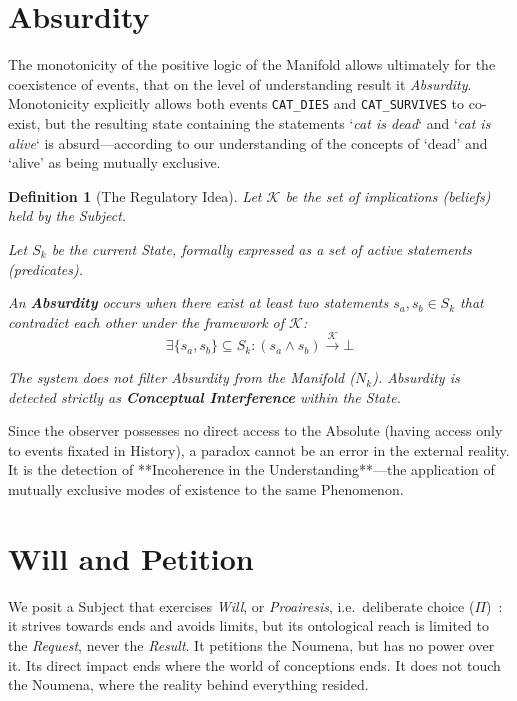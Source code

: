 \documentclass[11pt, a4paper]{article}
\theoremstyle{formalism}
\newtheorem{formalism}{Definition}
\begin{document}
{\section{Absurdity}

The monotonicity of the positive logic of the Manifold allows ultimately for
the coexistence of events, that on the level of understanding result it {\it
Absurdity}. Monotonicity explicitly allows both events \texttt{CAT\_DIES} and
\texttt{CAT\_SURVIVES} to co-exist, but the resulting state containing the
statements `{\it cat is dead\/}` and `{\it cat is alive\/}` is
absurd---according to our understanding of the concepts of `dead' and `alive'
as being mutually exclusive.

\begin{formalism}[The Regulatory Idea]
    Let $\mathcal{K}$ be the set of implications (beliefs) held by the Subject.

    Let $S_k$ be the current State, formally expressed as a set of active statements (predicates).
    
    An \textbf{Absurdity} occurs when there exist at least two statements 
    $s_a, s_b \in S_k$ that contradict each other under the framework of $\mathcal{K}$:
    \begin{equation}
    \exists \{s_a, s_b\} \subseteq S_k : (s_a \land s_b) \xrightarrow{\mathcal{K}} \bot
    \end{equation}
    
    The system does not filter Absurdity from the Manifold ($N_k$). Absurdity
    is detected strictly as \textbf{Conceptual Interference} within the State.

\end{formalism}

Since the observer possesses no direct access to the Absolute (having access
only to events fixated in History), a paradox cannot be an error in
the external reality. It is the detection of **Incoherence in the 
Understanding**---the application of mutually exclusive modes of existence 
to the same Phenomenon.

\section{Will and Petition}

We posit a Subject that exercises {\it Will}, or \textit{Proairesis},  i.e.\ 
deliberate choice ($\Pi$)~\cite{AristotleEthics}: it strives towards ends and
avoids limits, but its ontological reach is limited to the \textit{Request},
never the \textit{Result}. It petitions the Noumena, but has no power over it.
Its direct impact ends where the world of conceptions ends. It does not touch
the Noumena, where the reality behind everything resided.

}
\end{document}
